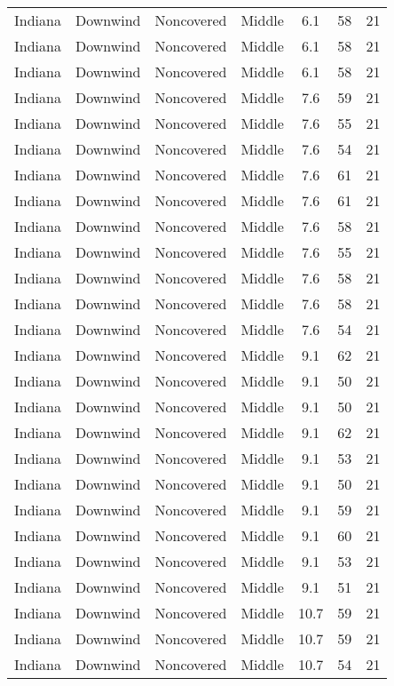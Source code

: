 \documentclass{article}
\begin{document}
\begin{longtable}[H]{ccccccc}
Indiana & Downwind & Noncovered & Middle & 6.1  & 58 & 21 \\
Indiana & Downwind & Noncovered & Middle & 6.1  & 58 & 21 \\
Indiana & Downwind & Noncovered & Middle & 6.1  & 58 & 21 \\
Indiana & Downwind & Noncovered & Middle & 7.6  & 59 & 21 \\
Indiana & Downwind & Noncovered & Middle & 7.6  & 55 & 21 \\
Indiana & Downwind & Noncovered & Middle & 7.6  & 54 & 21 \\
Indiana & Downwind & Noncovered & Middle & 7.6  & 61 & 21 \\
Indiana & Downwind & Noncovered & Middle & 7.6  & 61 & 21 \\
Indiana & Downwind & Noncovered & Middle & 7.6  & 58 & 21 \\
Indiana & Downwind & Noncovered & Middle & 7.6  & 55 & 21 \\
Indiana & Downwind & Noncovered & Middle & 7.6  & 58 & 21 \\
Indiana & Downwind & Noncovered & Middle & 7.6  & 58 & 21 \\
Indiana & Downwind & Noncovered & Middle & 7.6  & 54 & 21 \\
Indiana & Downwind & Noncovered & Middle & 9.1  & 62 & 21 \\
Indiana & Downwind & Noncovered & Middle & 9.1  & 50 & 21 \\
Indiana & Downwind & Noncovered & Middle & 9.1  & 50 & 21 \\
Indiana & Downwind & Noncovered & Middle & 9.1  & 62 & 21 \\
Indiana & Downwind & Noncovered & Middle & 9.1  & 53 & 21 \\
Indiana & Downwind & Noncovered & Middle & 9.1  & 50 & 21 \\
Indiana & Downwind & Noncovered & Middle & 9.1  & 59 & 21 \\
Indiana & Downwind & Noncovered & Middle & 9.1  & 60 & 21 \\
Indiana & Downwind & Noncovered & Middle & 9.1  & 53 & 21 \\
Indiana & Downwind & Noncovered & Middle & 9.1  & 51 & 21 \\
Indiana & Downwind & Noncovered & Middle & 10.7 & 59 & 21 \\
Indiana & Downwind & Noncovered & Middle & 10.7 & 59 & 21 \\
Indiana & Downwind & Noncovered & Middle & 10.7 & 54 & 21 \\

\end{longtable}
\end{document}
